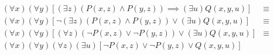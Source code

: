 \begin{priklad}
    \begin{align*}
        (\forall x)(\forall y) \left[ (\exists z) \left(P(x,z) \land
            P(y,z)\right) \implies (\exists u) Q(x,y,u) \right] &\equiv \\
        (\forall x)(\forall y)\left[\neg (\exists z)(P(x,z)\land 
            P(y,z))\lor(\exists u)Q(x,y,u)\right] &\equiv \\
        (\forall x)(\forall y)\left[(\forall z)(\neg P(x,z)\lor 
            \neg P(y,z))\lor(\exists u)Q(x,y,u)\right] &\equiv \\
        (\forall x)(\forall y)(\forall z)(\exists u) \left[ \neg P(x,z) \lor 
            \neg P(y,z) \lor Q(x,y,u) \right] &
    \end{align*}
\end{priklad}

